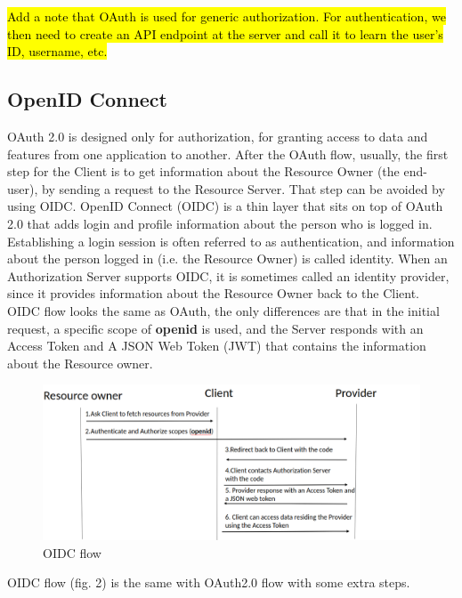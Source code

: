 \hl{Add a note that OAuth is used for generic authorization. For authentication, we then need to create an API endpoint at the server and call it to learn the user's ID, username, etc.}

\subsection{OpenID Connect}

OAuth 2.0 is designed only for authorization, for granting access to data and features from one application to another. After the OAuth flow, usually, the first step for the Client is to get information about the Resource Owner (the end-user), by sending a request to the Resource Server. That step can be avoided by using OIDC.
OpenID Connect (OIDC) is a thin layer that sits on top of OAuth 2.0 that adds login and profile information about the person who is logged in. Establishing a login session is often referred to as authentication, and information about the person logged in (i.e. the Resource Owner) is called identity. When an Authorization Server supports OIDC, it is sometimes called an identity provider, since it provides information about the Resource Owner back to the Client. OIDC flow looks the same as OAuth, the only differences are that in the initial request, a specific scope of \textbf{openid} is used, and the Server responds with an Access Token and A JSON Web Token (JWT) that contains the information about the Resource owner.

\begin{figure}[htb]
	\centering
	\includegraphics[scale=0.4]{figures/OIDC.png}
	\caption{OIDC flow}
\end{figure}

OIDC flow (fig. 2) is the same with OAuth2.0 flow with some extra steps.

